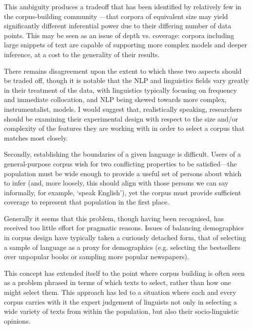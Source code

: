 This ambiguity produces a tradeoff that has been identified by relatively few in the corpus-building community ---that corpora of equivalent size may yield significantly different inferential power due to their differing number of data points.  This may be seen as an issue of depth vs. coverage: corpora including large snippets of text are capable of supporting more complex models and deeper inference, at a cost to the generality of their results.

There remains disagreement upon the extent to which these two aspects should be traded off, though it is notable that the NLP and linguistics fields vary greatly in their treatment of the data, with linguistics typically focusing on frequency and immediate collocation, and NLP being skewed towards more complex, instrumentalist, models.  I would suggest that, realistically speaking, researchers should be examining their experimental design with respect to the size and/or complexity of the features they are working with in order to select a corpus that matches most closely.



Secondly, establishing the boundaries of a given language is difficult.  Users of a general-purpose corpus wish for two conflicting properties to be satisfied---the population must be wide enough to provide a useful set of persons about which to infer (and, more loosely, this should align with those persons we can say informally, for example, `speak English'), yet the corpus must provide sufficient coverage to represent that population in the first place.

Generally it seems that this problem, though having been recognised, has received too little effort for pragmatic reasons.  Issues of balancing demographics in corpus design have typically taken a curiously detached form, that of selecting a sample of language as a proxy for demographics (e.g. selecting the bestsellers over unpopular books or sampling more popular newspapers).


This concept has extended itself to the point where corpus building is often seen as a problem phrased in terms of which texts to select, rather than how one might select them.  This approach has led to a situation where each and every corpus carries with it the expert judgement of linguists not only in selecting a wide variety of texts from within the population, but also their socio-linguistic opinions.

